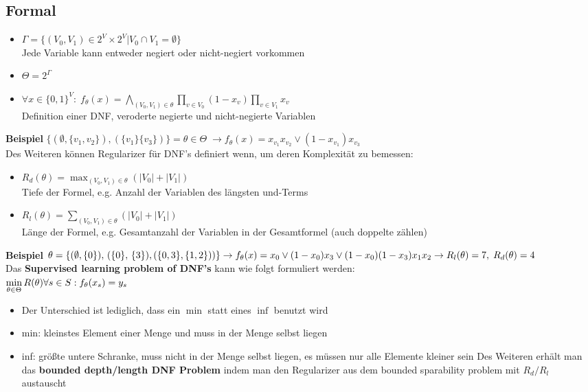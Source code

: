 \documentclass[12pt,a4paper]{article}
\newcommand{\nl}{\\[0.1cm]}
\begin{document}
\subsection{Formal}
\begin{itemize}
\item $\Gamma = \{(V_0, V_1) \in 2^V \times 2^V \vert V_0 \cap V_1 = \emptyset\}$\nl
Jede Variable kann entweder negiert oder nicht-negiert vorkommen
\item $\Theta = 2^\Gamma$
\item $\displaystyle \forall x \in \{0,1\}^V: \; f_\theta(x)= \bigwedge_{(V_0,V_1)\in\theta}\prod_{v\in V_0} (1-x_v) \prod_{v\in V_1} x_v$\nl
Definition einer DNF, veroderte negierte und nicht-negierte Variablen
\end{itemize}

\textbf{Beispiel}
$\{(\emptyset,  \{v_1, v_2\}), (\{v_1\}\{v_3\})\} = \theta \in \Theta \; \rightarrow f_\theta(x) = x_{v_1}x_{v_2} \lor (1-x_{v_1})x_{v_3}$\nl

Des Weiteren können Regularizer für DNF's definiert wenn, um deren Komplexität zu bemessen:
\begin{itemize}
\item $\displaystyle R_d(\theta) = \max_{(V_0,V_1)\in\theta} (|V_0| + |V_1|)$\nl
Tiefe der Formel, e.g. Anzahl der Variablen des längsten und-Terms
\item $\displaystyle R_l(\theta) = \sum_{(V_0,V_1)\in\theta} (|V_0| + |V_1|)$\nl
Länge der Formel, e.g. Gesamtanzahl der Variablen in der Gesamtformel (auch doppelte zählen)
\end{itemize}
\textbf{Beispiel} $\theta = \{(\emptyset, \{0\}),\,(\{0\},\,\{3\}),(\{0,3\},\{1,2\}))\}\\
\rightarrow f_\theta(x) = x_0 \lor (1-x_0)x_3\lor (1-x_0)(1-x_3)x_1 x_2 \rightarrow R_l(\theta) = 7 ,\; R_d(\theta)=4$\nl


Das \textbf{Supervised learning problem of DNF's} kann wie folgt formuliert werden:\nl
$\displaystyle \min_{\theta \in \Theta} R(\theta) \\ \forall s\in S: f_\theta(x_s) = y_s$
\begin{itemize}
\item Der Unterschied ist lediglich, dass ein $\min$ statt eines $\inf$ benutzt wird\
\item min: kleinstes Element einer Menge und muss in der Menge selbst liegen
\item inf: größte untere Schranke, muss nicht in der Menge selbst liegen, es müssen nur alle Elemente kleiner sein
Des Weiteren erhält man das \textbf{bounded depth/length DNF Problem} indem man den Regularizer aus dem bounded sparability problem mit $R_d/R_l$ austauscht
\end{itemize}
\end{document}
